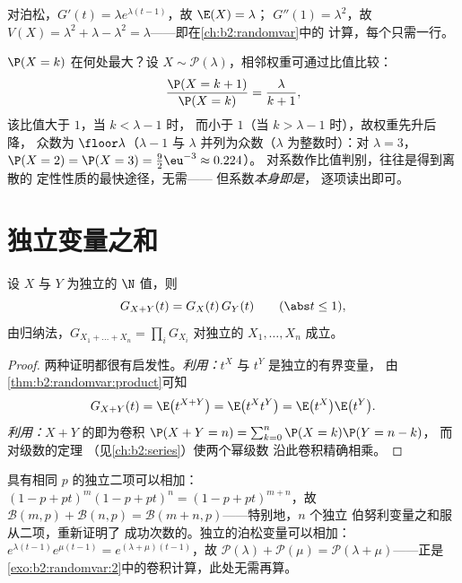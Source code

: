 \begin{example}
对泊松，$G'(t) = \lambda e^{\lambda(t-1)}$，故 $\E(X) = \lambda$；
$G''(1) = \lambda^2$，故 $V(X) = \lambda^2 + \lambda - \lambda^2 =
\lambda$——即在\cref{ch:b2:randomvar}中的
计算，每个只需一行。
\end{example}

\begin{example}[泊松分布的众数]
\label{ex:b2:genfun:poissonmode}
$\P(X = k)$ 在何处最大？设 $X \sim \mathcal
P(\lambda)$，相邻权重可通过比值比较：
\[
\frac{\P(X = k+1)}{\P(X = k)} = \frac{\lambda}{k + 1} ,
\]
该比值大于 $1$，当 $k < \lambda - 1$ 时，
而小于 $1$（当 $k > \lambda - 1$ 时），故权重先升后降，
众数为 $\floor\lambda$（$\lambda - 1$ 与
$\lambda$ 并列为众数（$\lambda$ 为整数时）：对 $\lambda = 3$，
$\P(X = 2) = \P(X = 3) = \frac92\eu^{-3} \approx 0.224$）。
对系数作比值判别，往往是得到离散的
定性性质的最快途径，无需——
但系数\emph{本身即是}，
逐项读出即可。
\end{example}

\section{独立变量之和}

\begin{theorem}[乘性]\label{thm:b2:genfun:product}
设 $X$ 与 $Y$ 为独立的 $\N$ 值，则
\[
G_{X + Y}(t) = G_X(t)\,G_Y(t)
\qquad (\abs t \leq 1),
\]
由归纳法，$G_{X_1 + \dots + X_n} = \prod_i G_{X_i}$
对独立的 $X_1, \dots, X_n$ 成立。
\end{theorem}

\begin{proof}
两种证明都很有启发性。\emph{利用：}$t^X$ 与
$t^Y$ 是独立的有界变量，
由\cref{thm:b2:randomvar:product}可知
\[
G_{X+Y}(t) = \E\bigl(t^{X+Y}\bigr)
= \E\bigl(t^X t^Y\bigr)
= \E\bigl(t^X\bigr)\E\bigl(t^Y\bigr) .
\]
\emph{利用：}$X + Y$ 的即为卷积
$\P(X + Y = n) = \sum_{k=0}^n \P(X = k)\P(Y = n - k)$，
而对级数的定理
（见\cref{ch:b2:series}）使两个幂级数
沿此卷积精确相乘。
\end{proof}

\begin{example}[经典分布的稳定性]\label{ex:b2:genfun:stability}
具有相同 $p$ 的独立二项可以相加：$(1 - p + pt)^m(1 -
p + pt)^n = (1 - p + pt)^{m+n}$，故 $\mathcal{B}(m, p) +
\mathcal{B}(n, p) = \mathcal{B}(m + n, p)$——特别地，$n$ 个独立
伯努利变量之和服从二项，重新证明了
成功次数的。独立的泊松变量可以相加：
$e^{\lambda(t-1)}e^{\mu(t-1)} = e^{(\lambda + \mu)(t-1)}$，故
$\mathcal{P}(\lambda) + \mathcal{P}(\mu) = \mathcal{P}(\lambda +
\mu)$——正是
\cref{exo:b2:randomvar:2}中的卷积计算，此处无需再算。
\end{example}


